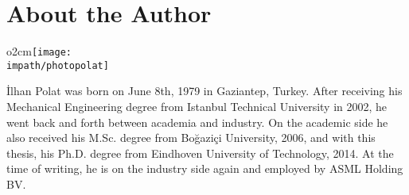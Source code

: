 \chapter{About the Author}
%
\begin{wrapfigure}[7]{o}{2cm}\centering\vspace{-4mm}\texttt{[image: \\impath/photopolat]}\end{wrapfigure}
İlhan Polat was born on June 8th, 1979 in Gaziantep, Turkey. After receiving his Mechanical Engineering degree from 
Istanbul Technical University in 2002, he went back and forth between academia and industry. On the academic side 
he also received his M.Sc. degree from Bo\u{g}azi\c{c}i University, 2006, and with this thesis, his Ph.D. degree from 
Eindhoven University of Technology, 2014. At the time of writing, he is on the industry side again and employed by ASML 
Holding BV. 

